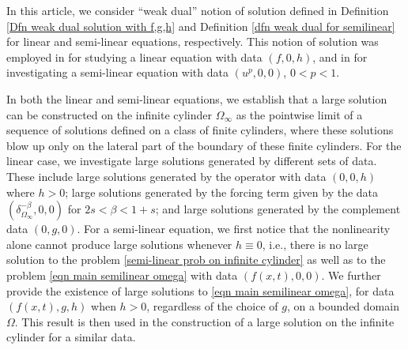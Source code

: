 \documentclass{amsart}
\begin{document}
\medskip

In this article, we consider ``weak dual'' notion of solution defined in Definition \ref{Dfn weak dual solution with f,g,h} and Definition \ref{dfn weak dual for semilinear} for linear and semi-linear equations, respectively. This notion of solution was employed in \cite{AbatangeloVazquez2023} for studying a linear equation with data $(f,0,h)$, and in \cite{BonforteFigalliVazquez2018} for investigating a semi-linear equation with data $(u^{p},0,0)$, $0<p<1$.

In both the linear and semi-linear equations, we establish that a large solution can be constructed on the infinite cylinder $\Omega_{\infty}$ as the pointwise limit of a sequence of solutions defined on a class of finite cylinders, where these solutions blow up only on the lateral part of the boundary of these finite cylinders. For the linear case, we investigate large solutions generated by different sets of data. These include large solutions generated by the operator with data $(0,0,h)$ where $h > 0$; large solutions generated by the forcing term given by the data $(\delta^{-\beta}_{\Omega_{\infty}}, 0, 0)$ for $2s < \beta < 1+s$; and large solutions generated by the complement data $(0, g, 0)$. For a semi-linear equation, we first notice that the nonlinearity alone cannot produce large solutions whenever $h\equiv 0$, i.e., there is no large solution to the problem \eqref{semi-linear prob on infinite cylinder} as well as to the problem \eqref{eqn main semilinear omega}  with data $(f(x,t), 0, 0)$. We further provide the existence of large solutions to \eqref{eqn main semilinear omega}, for data $(f(x,t),g,h)$ when $h>0$, regardless of the choice of $g$, on a bounded domain $\Omega$. This result is then used in the construction of a large solution on the infinite cylinder for a similar data.
\end{document}
